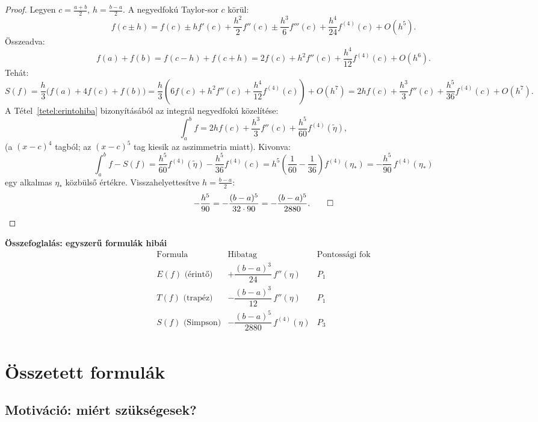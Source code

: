 \documentclass[a4paper,12pt]{article}
\theoremstyle{mydef}
\begin{document}
\begin{proof}
Legyen $c = \tfrac{a+b}{2}$, $h = \tfrac{b-a}{2}$. A negyedfokú Taylor-sor $c$ körül:
\[
  f(c \pm h) = f(c) \pm hf'(c) + \frac{h^2}{2}f''(c) \pm \frac{h^3}{6}f'''(c)
  + \frac{h^4}{24}f^{(4)}(c) + O(h^5).
\]
Összeadva:
\[
  f(a) + f(b) = f(c-h) + f(c+h) = 2f(c) + h^2 f''(c) + \frac{h^4}{12}f^{(4)}(c) + O(h^6).
\]
Tehát:
\[
  S(f) = \frac{h}{3}\bigl(f(a) + 4f(c) + f(b)\bigr)
       = \frac{h}{3}\left(6f(c) + h^2 f''(c) + \frac{h^4}{12}f^{(4)}(c)\right) + O(h^7)
       = 2hf(c) + \frac{h^3}{3}f''(c) + \frac{h^5}{36}f^{(4)}(c) + O(h^7).
\]
A Tétel~\ref{tetel:erintohiba} bizonyításából az integrál negyedfokú közelítése:
\[
  \int_a^b f = 2hf(c) + \frac{h^3}{3}f''(c) + \frac{h^5}{60}f^{(4)}(\tilde\eta),
\]
(a $(x-c)^4$ tagból; az $(x-c)^5$ tag kiesik az aszimmetria miatt). Kivonva:
\[
  \int_a^b f - S(f) = \frac{h^5}{60}f^{(4)}(\tilde\eta) - \frac{h^5}{36}f^{(4)}(c)
  = h^5\left(\frac{1}{60} - \frac{1}{36}\right)f^{(4)}(\eta_*)
  = -\frac{h^5}{90}\,f^{(4)}(\eta_*)
\]
egy alkalmas $\eta_*$ közbülső értékre. Visszahelyettesítve $h = \tfrac{b-a}{2}$:
\[
  -\frac{h^5}{90} = -\frac{(b-a)^5}{32 \cdot 90} = -\frac{(b-a)^5}{2880}. \qed
\]
\end{proof}

\begin{mdframed}[backgroundcolor=exbg,linewidth=0pt,innertopmargin=6pt,innerbottommargin=6pt]
\textbf{Összefoglalás: egyszerű formulák hibái}
\[
\renewcommand{\arraystretch}{1.5}
\begin{array}{l|c|c}
\text{Formula} & \text{Hibatag} & \text{Pontossági fok}\\
\hline
E(f)\text{ (érintő)} & +\dfrac{(b-a)^3}{24}\,f''(\eta) & P_1 \\
T(f)\text{ (trapéz)} & -\dfrac{(b-a)^3}{12}\,f''(\eta) & P_1 \\
S(f)\text{ (Simpson)} & -\dfrac{(b-a)^5}{2880}\,f^{(4)}(\eta) & P_3 \\
\end{array}
\]
\end{mdframed}

\section{Összetett formulák}
\label{sec:osszetett}

\subsection*{Motiváció: miért szükségesek?}
\end{document}
